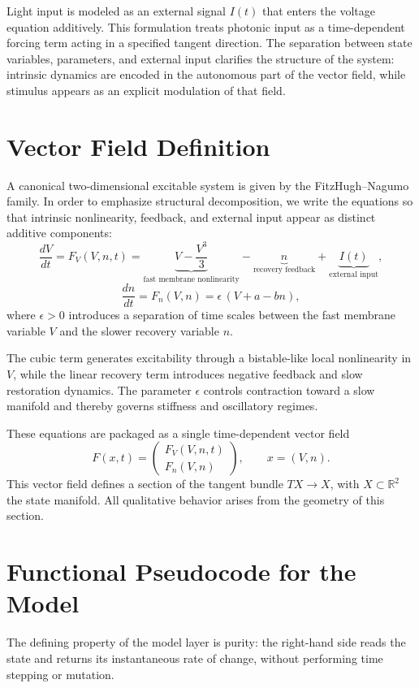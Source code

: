 \documentclass[12pt]{book}
\begin{document}
Light input is modeled as an external signal $I(t)$ that enters the
voltage equation additively. This formulation treats photonic input
as a time-dependent forcing term acting in a specified tangent
direction. The separation between state variables, parameters, and
external input clarifies the structure of the system: intrinsic
dynamics are encoded in the autonomous part of the vector field,
while stimulus appears as an explicit modulation of that field.

\section{Vector Field Definition}

A canonical two-dimensional excitable system is given by the
FitzHugh--Nagumo family. In order to emphasize structural decomposition,
we write the equations so that intrinsic nonlinearity, feedback, and
external input appear as distinct additive components:
\[
\frac{dV}{dt}
=
F_V(V,n,t)
=
\underbrace{V - \frac{V^3}{3}}_{\text{fast membrane nonlinearity}}
-
\underbrace{n}_{\text{recovery feedback}}
+
\underbrace{I(t)}_{\text{external input}},
\]
\[
\frac{dn}{dt}
=
F_n(V,n)
=
\epsilon\,(V + a - b n),
\]
where $\epsilon > 0$ introduces a separation of time scales between
the fast membrane variable $V$ and the slower recovery variable $n$.

The cubic term generates excitability through a bistable-like local
nonlinearity in $V$, while the linear recovery term introduces negative
feedback and slow restoration dynamics. The parameter $\epsilon$
controls contraction toward a slow manifold and thereby governs
stiffness and oscillatory regimes.

These equations are packaged as a single time-dependent vector field
\[
F(x,t)
=
\begin{pmatrix}
F_V(V,n,t) \\
F_n(V,n)
\end{pmatrix},
\qquad
x = (V,n).
\]
This vector field defines a section of the tangent bundle
$TX \to X$, with $X \subset \mathbb{R}^2$ the state manifold.
All qualitative behavior arises from the geometry of this section.

\section{Functional Pseudocode for the Model}

The defining property of the model layer is purity: the right-hand
side reads the state and returns its instantaneous rate of change,
without performing time stepping or mutation.
\end{document}
